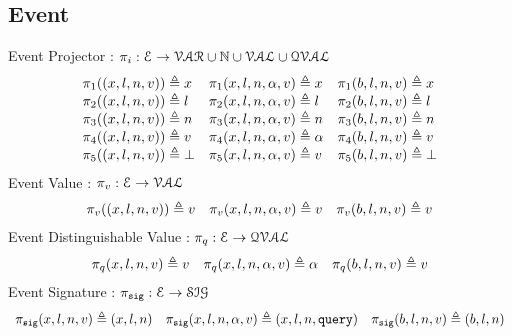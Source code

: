 %
%
\subsection{Event}
%
Event Projector : $\pi_i : \mathcal{E} \to \mathcal{VAR} \cup \mathbb{N} \cup \mathcal{VAL} \cup \mathcal{QVAL}$
\[
\begin{array}{lll}
\pi_1((x, l, n, v)) \triangleq x
&
\pi_1 (x, l, n, \alpha, v) \triangleq x
&
\pi_1 (b, l, n, v)  \triangleq x
\\
\pi_2((x, l, n, v)) \triangleq l
&
\pi_2 (x, l, n, \alpha, v) \triangleq l
&
\pi_2 (b, l, n, v)  \triangleq l
\\
\pi_3((x, l, n, v)) \triangleq n
&
\pi_3 (x, l, n, \alpha, v) \triangleq n
&
\pi_3 (b, l, n, v)  \triangleq n
\\
\pi_4((x, l, n, v)) \triangleq v
&
\pi_4 (x, l, n, \alpha, v) \triangleq \alpha
&
\pi_4 (b, l, n, v)  \triangleq v
\\
\pi_5((x, l, n, v)) \triangleq \bot
&
\pi_5 (x, l, n, \alpha, v) \triangleq v
&
\pi_5 (b, l, n, v)  \triangleq \bot
\end{array}
\]
%
Event Value : $\pi_v : \mathcal{E} \to \mathcal{VAL}$
\[
\begin{array}{lll}
\pi_v((x, l, n, v)) \triangleq v
&
\pi_v (x, l, n, \alpha, v) \triangleq v
&
\pi_v (b, l, n, v)  \triangleq v
\end{array}
\]
%
%
Event Distinguishable Value : $\pi_{q} : \mathcal{E} \to \mathcal{QVAL}$ 
\[
\begin{array}{lll}
\pi_{q} (x, l, n, v) \triangleq v
&
\pi_{q} (x, l, n, \alpha, v) \triangleq \alpha
&
\pi_{q} (b, l, n, v)  \triangleq v
\end{array}
\]%
% 
Event Signature : $\pi_{\mathtt{sig}} : \mathcal{E} \to \mathcal{SIG}$
\[
\begin{array}{lll}
\pi_{\mathtt{sig}} (x, l, n, v) \triangleq (x, l, n)
&
\pi_{\mathtt{sig}} (x, l, n, \alpha, v) \triangleq (x, l, n, {\tt query})
&
\pi_{\mathtt{sig}} (b, l, n, v)  \triangleq (b, l, n)
\end{array}
\]

